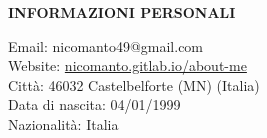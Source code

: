 \begin{minipage}[t]{0.3\textwidth}
		\textbf{INFORMAZIONI PERSONALI}
\end{minipage}%
\hfill
\hfill
\begin{minipage}[t]{0.6\textwidth}
	Email: nicomanto49@gmail.com \\
	Website: \url{nicomanto.gitlab.io/about-me} \\
	Città: 46032 Castelbelforte (MN) (Italia) \\
	Data di nascita: 04/01/1999 \\
	Nazionalità: Italia\\
\end{minipage}%


